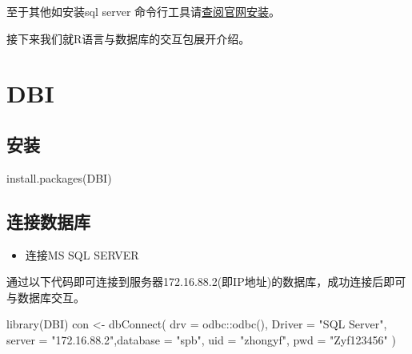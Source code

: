 \documentclass[
]{book}
\newenvironment{Shaded}{\begin{snugshade}}{\end{snugshade}}
\newcommand{\AttributeTok}[1]{\textcolor[rgb]{0.77,0.63,0.00}{#1}}
\newcommand{\FunctionTok}[1]{\textcolor[rgb]{0.00,0.00,0.00}{#1}}
\newcommand{\NormalTok}[1]{#1}
\newcommand{\OtherTok}[1]{\textcolor[rgb]{0.56,0.35,0.01}{#1}}
\newcommand{\SpecialCharTok}[1]{\textcolor[rgb]{0.00,0.00,0.00}{#1}}
\newcommand{\StringTok}[1]{\textcolor[rgb]{0.31,0.60,0.02}{#1}}
\providecommand{\tightlist}{%
  \setlength{\itemsep}{0pt}\setlength{\parskip}{0pt}}
\begin{document}
至于其他如安装sql server 命令行工具请\href{https://docs.microsoft.com/zh-cn/sql/linux/quickstart-install-connect-ubuntu?view=sql-server-linux-ver15\&preserve-view=true}{查阅官网安装}。

接下来我们就R语言与数据库的交互包展开介绍。

\hypertarget{dbi}{%
\section{DBI}\label{dbi}}

\hypertarget{ux5b89ux88c5-2}{%
\subsection{安装}\label{ux5b89ux88c5-2}}

\begin{Shaded}
\begin{Highlighting}[]
\FunctionTok{install.packages}\NormalTok{(}\StringTok{\textquotesingle{}DBI\textquotesingle{}}\NormalTok{)}
\end{Highlighting}
\end{Shaded}

\hypertarget{ux8fdeux63a5ux6570ux636eux5e93}{%
\subsection{连接数据库}\label{ux8fdeux63a5ux6570ux636eux5e93}}

\begin{itemize}
\tightlist
\item
  连接MS SQL SERVER
\end{itemize}

通过以下代码即可连接到服务器172.16.88.2(即IP地址)的数据库，成功连接后即可与数据库交互。

\begin{Shaded}
\begin{Highlighting}[]
\FunctionTok{library}\NormalTok{(DBI)}
\NormalTok{con }\OtherTok{\textless{}{-}} \FunctionTok{dbConnect}\NormalTok{(}
  \AttributeTok{drv =}\NormalTok{ odbc}\SpecialCharTok{::}\FunctionTok{odbc}\NormalTok{(), }\AttributeTok{Driver =} \StringTok{"SQL Server"}\NormalTok{, }\AttributeTok{server =} \StringTok{"172.16.88.2"}\NormalTok{,}\AttributeTok{database =} \StringTok{"spb"}\NormalTok{, }\AttributeTok{uid =} \StringTok{"zhongyf"}\NormalTok{, }\AttributeTok{pwd =} \StringTok{"Zyf123456"}
\NormalTok{)}
\end{Highlighting}
\end{Shaded}
\end{document}
